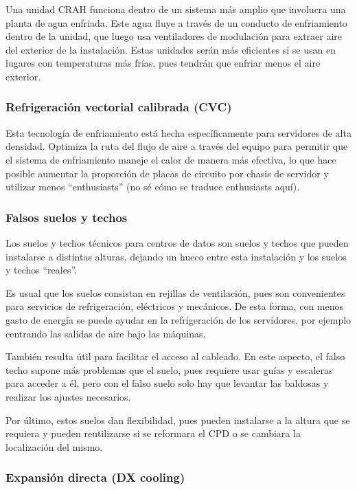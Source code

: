Una unidad CRAH funciona dentro de un sistema más amplio que involucra una planta de agua enfriada. Este agua fluye a través de un conducto de enfriamiento dentro de la unidad, que luego usa ventiladores de modulación para extraer aire del exterior de la instalación. Estas unidades serán más eficientes si se usan en lugares con temperaturas más frías, pues tendrán que enfriar menos el aire exterior.

\subsubsection*{Refrigeración vectorial calibrada (CVC)}

Esta tecnología de enfriamiento está hecha específicamente para servidores de alta densidad. Optimiza la ruta del flujo de aire a través del equipo para permitir que el sistema de enfriamiento maneje el calor de manera más efectiva, lo que hace posible aumentar la proporción de placas de circuito por chasis de servidor y utilizar menos “enthusiasts” (no sé cómo se traduce enthusiasts aquí).

\subsubsection*{Falsos suelos y techos}

Los suelos y techos técnicos para centros de datos son suelos y techos que pueden instalarse a distintas alturas, dejando un hueco entre esta instalación y los suelos y techos “reales”.

Es usual que los suelos consistan en rejillas de ventilación, pues son convenientes para servicios de refrigeración, eléctricos y mecánicos. De esta forma, con menos gasto de energía se puede ayudar en la refrigeración de los servidores, por ejemplo centrando las salidas de aire bajo las máquinas.

También resulta útil para facilitar el acceso al cableado. En este aspecto, el falso techo supone más problemas que el suelo, pues requiere usar guías y escaleras para acceder a él, pero con el falso suelo solo hay que levantar las baldosas y realizar los ajustes necesarios.

Por último, estos suelos dan flexibilidad, pues pueden instalarse a la altura que se requiera y pueden reutilizarse si se reformara el CPD o se cambiara la localización del mismo.

\subsubsection*{Expansión directa (DX cooling)}

